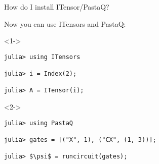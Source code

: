 \begin{frame}[fragile]{How do I install ITensor/PastaQ?}

Now you can use ITensors and PastaQ:

\begin{onlyenv}<1->
\begin{lstlisting}[language=JuliaLocal, mathescape, numbers=none, style=julia, basicstyle=\small]
julia> using ITensors

julia> i = Index(2);

julia> A = ITensor(i);
\end{lstlisting}
\end{onlyenv}

\begin{onlyenv}<2->
\begin{lstlisting}[language=JuliaLocal, mathescape, numbers=none, style=julia, basicstyle=\small]
julia> using PastaQ

julia> gates = [("X", 1), ("CX", (1, 3))];

julia> $\psi$ = runcircuit(gates);
\end{lstlisting}
\end{onlyenv}

\end{frame}
